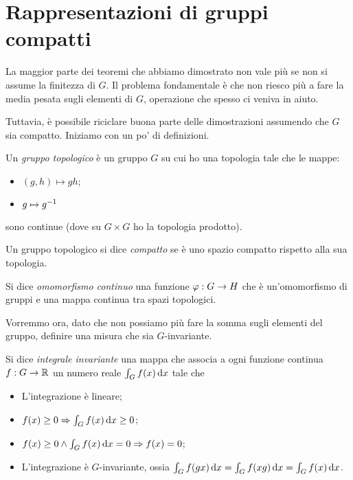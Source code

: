 \section{Rappresentazioni di gruppi compatti}
	La maggior parte dei teoremi che abbiamo dimostrato non vale più se non si assume la finitezza di $G$. Il problema fondamentale è che non riesco più a fare la media pesata sugli elementi di $G$, operazione che spesso ci veniva in aiuto.
	
	Tuttavia, è possibile riciclare buona parte delle dimostrazioni assumendo che $G$ sia compatto. Iniziamo con un po' di definizioni.
	
	\begin{mydef}
		Un \emph{gruppo topologico} è un gruppo $G$ su cui ho una topologia tale che le mappe:
		\begin{itemize}
		 \item $(g,h) \mapsto gh$;
		 \item $g \mapsto g^{-1}$
		\end{itemize}
		sono continue (dove su $G\times G$ ho la topologia prodotto).
	\end{mydef}
	
	\begin{mydef}
		Un gruppo topologico si dice \emph{compatto} se è uno spazio compatto rispetto alla sua topologia.
	\end{mydef}
	
	\begin{mydef}
		Si dice \emph{omomorfismo continuo} una funzione $\varphi: G\rightarrow H$ che è un'omomorfismo di gruppi e una mappa continua tra spazi topologici.  
	\end{mydef}

	Vorremmo ora, dato che non possiamo più fare la somma sugli elementi del gruppo, definire una misura che sia $G$-invariante. 
	\begin{mydef}
		Si dice \emph{integrale invariante} una mappa che associa a ogni funzione continua $f: G \rightarrow \mathbb R$ un numero reale $\int_G f(x) \, \textrm{d} x$ tale che 
		\begin{itemize}
		 \item L'integrazione è lineare;
		 \item $f(x)\ge 0 \Rightarrow \int_{G} f(x) \, \textrm{d} x \ge 0$;
		 \item $f(x)\ge 0 \wedge \int_{G} f(x) \, \textrm{d} x = 0 \Rightarrow f(x)=0$; 
		 \item L'integrazione è $G$-invariante, ossia $\int_{G} f(gx) \, \textrm{d} x=\int_{G} f(xg) \, \textrm{d} x=\int_{G} f(x) \, \textrm{d} x$.
		\end{itemize}
	\end{mydef}
	
